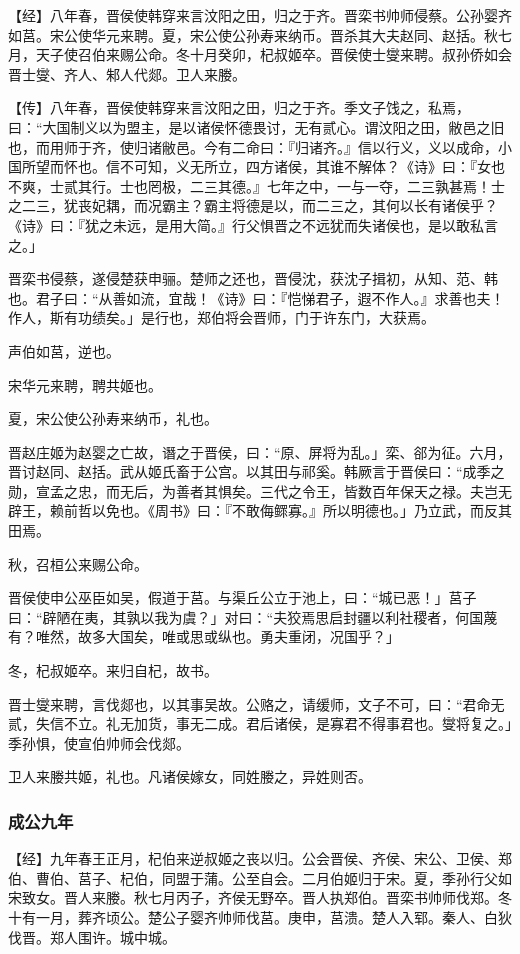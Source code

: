 \documentclass[]{article}
\begin{document}
【经】八年春，晋侯使韩穿来言汶阳之田，归之于齐。晋栾书帅师侵蔡。公孙婴齐如莒。宋公使华元来聘。夏，宋公使公孙寿来纳币。晋杀其大夫赵同、赵括。秋七月，天子使召伯来赐公命。冬十月癸卯，杞叔姬卒。晋侯使士燮来聘。叔孙侨如会晋士燮、齐人、邾人代郯。卫人来媵。

【传】八年春，晋侯使韩穿来言汶阳之田，归之于齐。季文子饯之，私焉，曰：``大国制义以为盟主，是以诸侯怀德畏讨，无有贰心。谓汶阳之田，敝邑之旧也，而用师于齐，使归诸敝邑。今有二命曰：『归诸齐。』信以行义，义以成命，小国所望而怀也。信不可知，义无所立，四方诸侯，其谁不解体？《诗》曰：『女也不爽，士贰其行。士也罔极，二三其德。』七年之中，一与一夺，二三孰甚焉！士之二三，犹丧妃耦，而况霸主？霸主将德是以，而二三之，其何以长有诸侯乎？《诗》曰：『犹之未远，是用大简。』行父惧晋之不远犹而失诸侯也，是以敢私言之。」

晋栾书侵蔡，遂侵楚获申骊。楚师之还也，晋侵沈，获沈子揖初，从知、范、韩也。君子曰：``从善如流，宜哉！《诗》曰：『恺悌君子，遐不作人。』求善也夫！作人，斯有功绩矣。」是行也，郑伯将会晋师，门于许东门，大获焉。

声伯如莒，逆也。

宋华元来聘，聘共姬也。

夏，宋公使公孙寿来纳币，礼也。

晋赵庄姬为赵婴之亡故，谮之于晋侯，曰：``原、屏将为乱。」栾、郤为征。六月，晋讨赵同、赵括。武从姬氏畜于公宫。以其田与祁奚。韩厥言于晋侯曰：``成季之勋，宣孟之忠，而无后，为善者其惧矣。三代之令王，皆数百年保天之禄。夫岂无辟王，赖前哲以免也。《周书》曰：『不敢侮鳏寡。』所以明德也。」乃立武，而反其田焉。

秋，召桓公来赐公命。

晋侯使申公巫臣如吴，假道于莒。与渠丘公立于池上，曰：``城已恶！」莒子曰：``辟陋在夷，其孰以我为虞？」对曰：``夫狡焉思启封疆以利社稷者，何国蔑有？唯然，故多大国矣，唯或思或纵也。勇夫重闭，况国乎？」

冬，杞叔姬卒。来归自杞，故书。

晋士燮来聘，言伐郯也，以其事吴故。公赂之，请缓师，文子不可，曰：``君命无贰，失信不立。礼无加货，事无二成。君后诸侯，是寡君不得事君也。燮将复之。」季孙惧，使宣伯帅师会伐郯。

卫人来媵共姬，礼也。凡诸侯嫁女，同姓媵之，异姓则否。

\hypertarget{header-n1640}{%
\subsubsection{成公九年 }\label{header-n1640}}

【经】九年春王正月，杞伯来逆叔姬之丧以归。公会晋侯、齐侯、宋公、卫侯、郑伯、曹伯、莒子、杞伯，同盟于蒲。公至自会。二月伯姬归于宋。夏，季孙行父如宋致女。晋人来媵。秋七月丙子，齐侯无野卒。晋人执郑伯。晋栾书帅师伐郑。冬十有一月，葬齐顷公。楚公子婴齐帅师伐莒。庚申，莒溃。楚人入郓。秦人、白狄伐晋。郑人围许。城中城。
\end{document}
